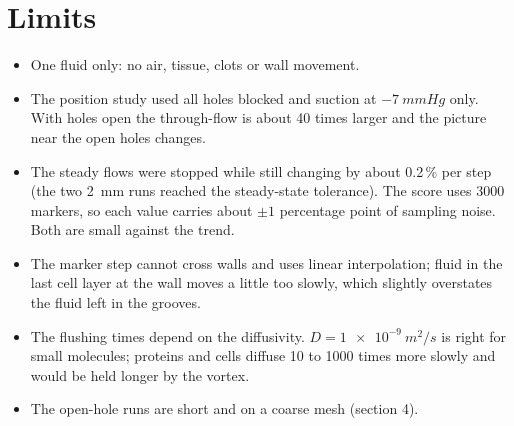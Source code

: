 \documentclass[10pt,a4paper]{article}
\begin{document}
\section{Limits}
\begin{itemize}\setlength\itemsep{1pt}
\item One fluid only: no air, tissue, clots or wall movement.
\item The position study used all holes blocked and suction at $-\SI{7}{mmHg}$ only. With holes open the
through-flow is about 40 times larger and the picture near the open holes changes.
\item The steady flows were stopped while still changing by about 0.2\,\% per step (the two \SI{2}{mm} runs
reached the steady-state tolerance). The score uses 3000 markers, so each value carries about
$\pm1$ percentage point of sampling noise. Both are small against the trend.
\item The marker step cannot cross walls and uses linear interpolation; fluid in the last cell layer at the
wall moves a little too slowly, which slightly overstates the fluid left in the grooves.
\item The flushing times depend on the diffusivity. $D=\SI{1e-9}{m^2/s}$ is right for small molecules; proteins
and cells diffuse 10 to 1000 times more slowly and would be held longer by the vortex.
\item The open-hole runs are short and on a coarse mesh (section 4).
\end{itemize}
\end{document}
